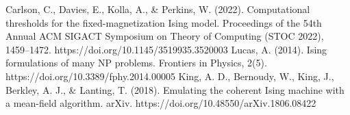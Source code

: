 \documentclass[conference]{IEEEtran}
\begin{document}
\begin{thebibliography}{00}
 Carlson, C., Davies, E., Kolla, A., \& Perkins, W. (2022). Computational thresholds for the fixed-magnetization Ising model. Proceedings of the 54th Annual ACM SIGACT Symposium on Theory of Computing (STOC 2022), 1459–1472. https://doi.org/10.1145/3519935.3520003
 Lucas, A. (2014). Ising formulations of many NP problems. Frontiers in Physics, 2(5). https://doi.org/10.3389/fphy.2014.00005
 King, A. D., Bernoudy, W., King, J., Berkley, A. J., \& Lanting, T. (2018). Emulating the coherent Ising machine with a mean-field algorithm. arXiv. https://doi.org/10.48550/arXiv.1806.08422



\end{thebibliography}
\end{document}

